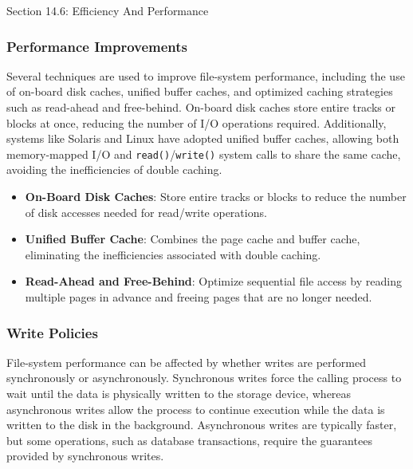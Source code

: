 \begin{notes}{Section 14.6: Efficiency And Performance}
    \subsubsection*{Performance Improvements}
    
    Several techniques are used to improve file-system performance, including the use of on-board disk caches, unified buffer caches, and optimized caching strategies such as read-ahead and free-behind. 
    On-board disk caches store entire tracks or blocks at once, reducing the number of I/O operations required. Additionally, systems like Solaris and Linux have adopted unified buffer caches, allowing 
    both memory-mapped I/O and \texttt{read()}/\texttt{write()} system calls to share the same cache, avoiding the inefficiencies of double caching.
    
    \begin{highlight}
    
        \begin{itemize}
            \item \textbf{On-Board Disk Caches}: Store entire tracks or blocks to reduce the number of disk accesses needed for read/write operations.
            \item \textbf{Unified Buffer Cache}: Combines the page cache and buffer cache, eliminating the inefficiencies associated with double caching.
            \item \textbf{Read-Ahead and Free-Behind}: Optimize sequential file access by reading multiple pages in advance and freeing pages that are no longer needed.
        \end{itemize}
    
    \end{highlight}
    
    \subsubsection*{Write Policies}
    
    File-system performance can be affected by whether writes are performed synchronously or asynchronously. Synchronous writes force the calling process to wait until the data is physically written to 
    the storage device, whereas asynchronous writes allow the process to continue execution while the data is written to the disk in the background. Asynchronous writes are typically faster, but some 
    operations, such as database transactions, require the guarantees provided by synchronous writes.
    

\end{notes}
